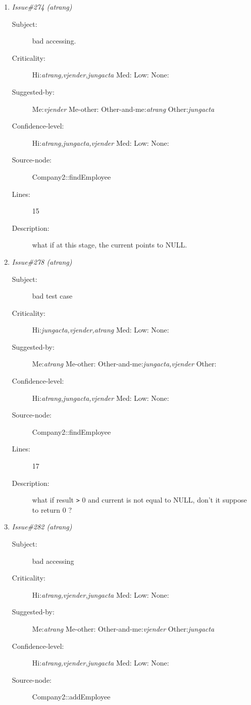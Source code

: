 \begin{enumerate}
\begin{description}
\item [Lines:] 3-7

\item [Description:] numEmployee should be init to 0
\end{description}
\item {\it Issue\#274 (atrang)}
\begin{description}
\item [Subject:] bad accessing.
\item [Criticality:] Hi:{\it atrang,vjender,jungacta} Med:{\it } Low:{\it } None:{\it }
\item [Suggested-by:] Me:{\it vjender} Me-other:{\it } Other-and-me:{\it atrang} Other:{\it jungacta}
\item [Confidence-level:] Hi:{\it atrang,jungacta,vjender} Med:{\it } Low:{\it } None:{\it }
\item [Source-node:] Company2::findEmployee

\item [Lines:] 15

\item [Description:] what if at this stage, the current points to NULL.
\end{description}
\item {\it Issue\#278 (atrang)}
\begin{description}
\item [Subject:] bad test case
\item [Criticality:] Hi:{\it jungacta,vjender,atrang} Med:{\it } Low:{\it } None:{\it }
\item [Suggested-by:] Me:{\it atrang} Me-other:{\it } Other-and-me:{\it jungacta,vjender} Other:{\it }
\item [Confidence-level:] Hi:{\it atrang,jungacta,vjender} Med:{\it } Low:{\it } None:{\it }
\item [Source-node:] Company2::findEmployee

\item [Lines:] 17

\item [Description:] what if result {\tt >} 0 and current is not equal to NULL, don't it suppose to
return 0 ?
\end{description}
\item {\it Issue\#282 (atrang)}
\begin{description}
\item [Subject:] bad accessing
\item [Criticality:] Hi:{\it atrang,vjender,jungacta} Med:{\it } Low:{\it } None:{\it }
\item [Suggested-by:] Me:{\it atrang} Me-other:{\it } Other-and-me:{\it vjender} Other:{\it jungacta}
\item [Confidence-level:] Hi:{\it atrang,vjender,jungacta} Med:{\it } Low:{\it } None:{\it }
\item [Source-node:] Company2::addEmployee


\end{description}
\end{enumerate}
